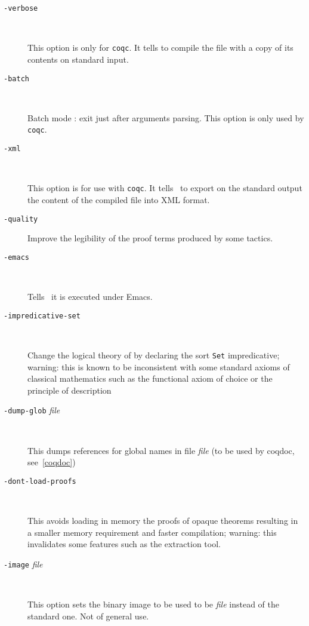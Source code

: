 \begin{description}
\item[{\tt -verbose}]\ 

  This option is only for {\tt coqc}. It tells to compile the file with
  a copy of its contents on standard input.

\item[{\tt -batch}]\ 

  Batch mode : exit just after arguments parsing. This option is only
  used by {\tt coqc}.

%

\item[{\tt -xml}]\ 

  This option is for use with {\tt coqc}. It tells \Coq\ to export on
  the standard output the content of the compiled file into XML format.

\item[{\tt -quality}]

  Improve the legibility of the proof terms produced by some tactics.

\item[{\tt -emacs}]\ 

  Tells \Coq\ it is executed under Emacs.

\item[{\tt -impredicative-set}]\ 

  Change the logical theory of {\Coq} by declaring the sort {\tt Set}
  impredicative; warning: this is known to be inconsistent with
  some standard axioms of classical mathematics such as the functional
  axiom of choice or the principle of description

\item[{\tt -dump-glob} {\em file}]\

  This dumps references for global names in file {\em file}
  (to be used by coqdoc, see~\ref{coqdoc})
 
\item[{\tt -dont-load-proofs}]\ 

  This avoids loading in memory the proofs of opaque theorems
  resulting in a smaller memory requirement and faster compilation;
  warning: this invalidates some features such as the extraction tool.

\item[{\tt -image} {\em file}]\ 

  This option sets the binary image to be used to be {\em file}
  instead of the standard one. Not of general use.


\end{description}
